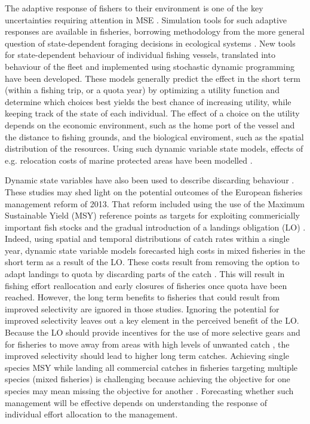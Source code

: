 \documentclass[12pt,oneline,a4paper,numbib]{ouparticle}
\numberwithin{equation}{subsection} %
\begin{document}
The adaptive response of fishers to their environment is one of the key uncertainties requiring attention in MSE \cite{Fulton2007}. Simulation tools for such adaptive responses are available in fisheries, borrowing methodology from the more general question of state-dependent foraging decisions in ecological systems \cite{ClarkandMangel2000,Houston1999}. New tools for state-dependent behaviour of individual fishing vessels, translated into behaviour of the fleet and implemented using stochastic dynamic programming \cite{Alzorriz2018,Batsleer2015, Dowling2011, Poos2010, Gillis1995} have been developed. These models generally predict the effect in the short term (within a fishing trip, or a quota year) by optimizing a utility function and determine which choices best yields the best chance of increasing utility, while keeping track of the state of each individual. The effect of a choice on the utility depends on the economic environment, such as the home port of the vessel and the distance to fishing grounds, and the biological enviroment, such as the spatial distribution of the resources. Using such dynamic variable state models, effects of e.g. relocation costs of marine protected areas have been modelled \cite{Dowling2011}.

Dynamic state variables have also been used to describe discarding behaviour \cite{Batsleer2015, Batsleer2013, Gillis1995}. These studies may shed light on the potential outcomes of the European fisheries management reform of 2013. That reform included using the use of the Maximum Sustainable Yield (MSY) reference points as targets for exploiting commericially important fish stocks and the gradual introduction of a landings obligation (LO) \cite{CFP2013}. Indeed, using spatial and temporal distributions of catch rates within a single year, dynamic state variable models forecasted  high costs in mixed fisheries in the short term as a result of the LO. These costs result from removing the option to adapt landings to quota by discarding parts of the catch \cite{Alzorriz2018}. This will result in fishing effort reallocation and early closures of fisheries once quota have been reached. However, the  long term benefits to fisheries that could result from improved selectivity are ignored in those studies. Ignoring the potential for improved selectivity leaves out a key element in the perceived benefit of the LO. Because the LO should provide incentives for the use of more selective gears and for fisheries to  move away from areas with high levels of unwanted catch \cite{Alzorriz2016, Alzorriz2018}, the improved selectivity should lead to higher long term catches. Achieving single species MSY while landing all commercial catches in fisheries targeting multiple species (mixed fisheries) is challenging because achieving the objective for one species may mean missing the objective for another \cite{Batsleer2013,Ulrich2017}. Forecasting whether such management will be effective depends on understanding the response of individual effort allocation to the management.
\end{document}
